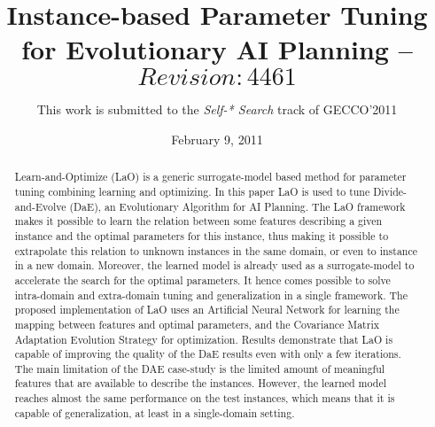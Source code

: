 \documentclass{acm_proc_article-sp}
\begin{document}
\title{Instance-based Parameter Tuning\\
for Evolutionary AI Planning -- $Revision: 4461$}


\author{This work is submitted to the {\large \em Self-* Search} track of GECCO'2011}

% 

\date{February 9, 2011}
\maketitle
\begin{abstract}
\noindent Learn-and-Optimize (LaO) is a generic surrogate-model based method for parameter tuning combining learning and optimizing. In this paper LaO is used to tune Divide-and-Evolve (DaE), an Evolutionary Algorithm for AI Planning. The LaO framework makes it possible to learn the relation between some features describing a given instance and the optimal parameters for this instance, thus making it possible to extrapolate this relation to unknown instances in the same domain, or even to instance in a new domain. Moreover, the learned model is already used as a surrogate-model to accelerate the search for the optimal parameters. It hence comes possible to solve intra-domain and extra-domain tuning and generalization in a single framework. The proposed implementation of LaO uses an Artificial Neural Network for learning the mapping between features and optimal parameters, and the Covariance Matrix Adaptation Evolution Strategy for optimization. Results demonstrate that LaO is capable of improving the quality of the DaE results even with only a few iterations. The main limitation of the DAE case-study is the limited amount of meaningful features that are available to describe the instances. However, the learned model reaches almost the same performance on the test instances, which means that it is capable of generalization, at least in a single-domain setting. 

\end{abstract}
\end{document}
